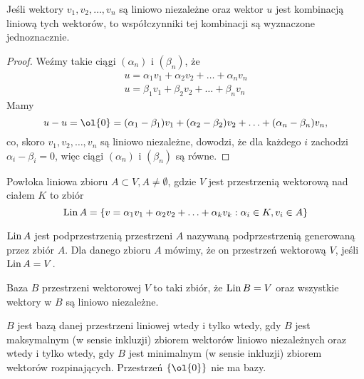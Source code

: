 \begin{theorem}
    \label{t:explicit coefficients}
    Jeśli wektory $v_1, v_2, \ldots, v_n$ są liniowo niezależne oraz wektor $u$ jest kombinacją liniową tych wektorów, to współczynniki tej kombinacji są wyznaczone jednoznacznie.
\end{theorem}
\begin{proof}
    Weźmy takie ciągi $(\alpha_n)$ i $(\beta_n)$, że
    \begin{align*}
        u = \alpha_1v_1 + \alpha_2v_2 + \ldots + \alpha_nv_n \\
        u = \beta_1v_1 + \beta_2v_2 + \ldots + \beta_nv_n
    \end{align*}
    Mamy
    \[ u - u = \ol{0} = (\alpha_1 - \beta_1)v_1 + (\alpha_2 - \beta_2)v_2 + \ldots + (\alpha_n - \beta_n)v_n, \]
    co, skoro $v_1, v_2, \ldots, v_n$ są liniowo niezależne, dowodzi, że dla każdego $i$ zachodzi $\alpha_i - \beta_i = 0$, więc ciągi $(\alpha_n)$ i $(\beta_n)$ są równe.
\end{proof}

\begin{definition}
    Powłoka liniowa zbioru $A \subset V, A \neq \emptyset$, gdzie $V$ jest przestrzenią wektorową nad ciałem $K$ to zbiór
    \[ \operatorname{Lin} A = \{v = \alpha_1v_1 + \alpha_2v_2 + \ldots + \alpha_kv_k : \alpha_i \in K, v_i \in A\} \]
\end{definition}

$\operatorname{Lin} A$ jest podprzestrzenią przestrzeni $A$ nazywaną podprzestrzenią generowaną przez zbiór $A$. Dla danego zbioru $A$ mówimy, że  on przestrzeń wektorową $V$, jeśli $\operatorname{Lin} A = V$.

\begin{definition}
    Baza $B$ przestrzeni wektorowej $V$ to taki zbiór, że $\operatorname{Lin} B = V$ oraz wszystkie wektory w $B$ są liniowo niezależne.
\end{definition}

$B$ jest bazą danej przestrzeni liniowej wtedy i tylko wtedy, gdy $B$ jest maksymalnym (w sensie inkluzji) zbiorem wektorów liniowo niezależnych oraz wtedy i tylko wtedy, gdy $B$ jest minimalnym (w sensie inkluzji) zbiorem wektorów rozpinających. Przestrzeń $\{\ol{0}\}$ nie ma bazy.

